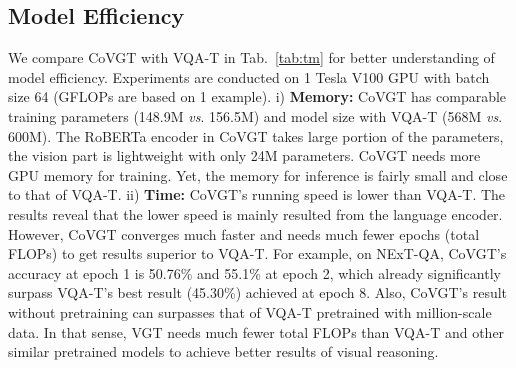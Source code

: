 \documentclass[10pt,journal,compsoc]{IEEEtran}
\newcommand{\vs}{\textit{vs}. }
\begin{document}
\subsection{Model Efficiency}
\setlength{\tabcolsep}{5pt}
\begin{table}[t!]
    \small
    \centering
    \caption{Comparison of memory and time based on NExT-QA \cite{xiao2021next}. (2m8: 2 minutes per epoch and 8 epochs in total.) 
    }
    \vspace{-0.5em}
    \label{tab:tm}
    \vspace{-0.4cm}
\end{table}



We compare CoVGT with VQA-T in Tab.~\ref{tab:tm} for better understanding of model efficiency. Experiments are conducted on 1 Tesla V100 GPU with batch size 64 (GFLOPs are based on 1 example).
i) \textbf{{Memory:}} CoVGT has comparable training parameters (148.9M \vs 156.5M) and model size with VQA-T (568M \vs 600M). The RoBERTa encoder in CoVGT takes large portion of the parameters, the vision part is lightweight with only 24M parameters. CoVGT needs more GPU memory for training. Yet, the memory for inference is fairly small and close to that of VQA-T. 
ii) \textbf{{Time:}} CoVGT's running speed is lower than VQA-T. The results reveal that the lower speed is mainly resulted from the language encoder. 
However, CoVGT converges much faster and needs much fewer epochs (total FLOPs) to get results superior to VQA-T. For example, on NExT-QA, CoVGT's accuracy at epoch 1 is 50.76\% and 55.1\% at epoch 2, which already significantly surpass VQA-T's best result (45.30\%) achieved at epoch 8. Also, CoVGT's result without pretraining can surpasses that of VQA-T pretrained with million-scale data. In that sense, VGT needs much fewer total FLOPs than VQA-T and other similar pretrained models to achieve better results of visual reasoning. 
\end{document}
